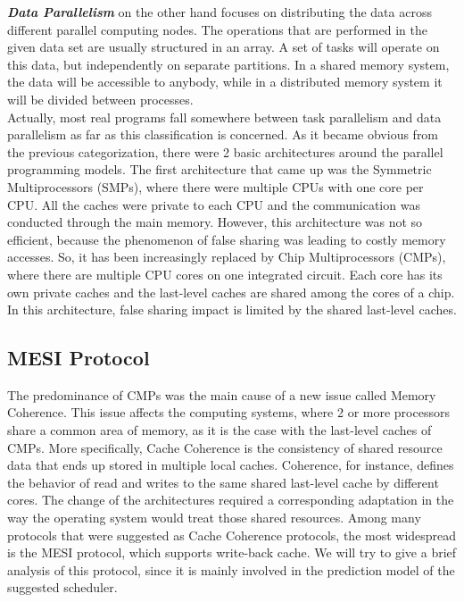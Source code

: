 \documentclass[diploma]{Styles/softlab-thesis}
\begin{document}
\textbf{\emph{Data Parallelism}} on the other hand focuses on distributing the data across different parallel computing nodes. The operations that are performed in the given data set are usually structured in an array. A set of tasks will operate on this data, but independently on separate partitions. In a shared memory system, the data will be accessible to anybody, while in a distributed memory system it will be divided between processes. \\

Actually, most real programs fall somewhere between task parallelism and data parallelism as far as this classification is concerned. As it became obvious from the previous categorization, there were 2 basic architectures around the parallel programming models. The first architecture that came up was the Symmetric Multiprocessors (SMPs), where there were multiple CPUs with one core per CPU. All the caches were private to each CPU and the communication was conducted through the main memory. However, this architecture was not so efficient, because the phenomenon of false sharing was leading to costly memory accesses. So, it has been increasingly replaced by Chip Multiprocessors (CMPs), where there are multiple CPU cores on one integrated circuit. Each core has its own private caches and the last-level caches are shared among the cores of a chip. In this architecture, false sharing impact is limited by the shared last-level caches.

\subsection{MESI Protocol}

The predominance of CMPs was the main cause of a new issue called Memory Coherence. This issue affects the computing systems, where 2 or more processors share a common area of memory, as it is the case with the last-level caches of CMPs. More specifically, Cache Coherence is the consistency of shared resource data that ends up stored in multiple local caches. Coherence, for instance, defines the behavior of read and writes to the same shared last-level cache by different cores. The change of the architectures required a corresponding adaptation in the way the operating system would treat those shared resources. Among many protocols that were suggested as Cache Coherence protocols, the most widespread is the MESI protocol, which supports write-back cache. We will try to give a brief analysis of this protocol, since it is mainly involved in the prediction model of the suggested scheduler. \\
\end{document}
